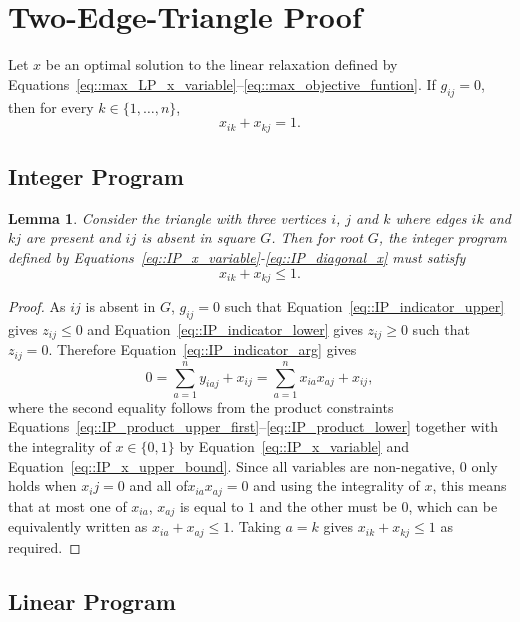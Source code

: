 \documentclass[11pt]{article}
\newtheorem{lemma}{Lemma}
\begin{document}
\section{Two-Edge-Triangle Proof} \label{sec::two_edge_triangle_proof}

Let $x$ be an optimal solution to the linear relaxation defined by Equations~\eqref{eq::max_LP_x_variable}--\eqref{eq::max_objective_funtion}. 
If $g_{ij}=0$, then for every $k\in\{1,\dots,n\}$,
\[
x_{ik}+x_{kj}=1.
\]

\subsection{Integer Program} \label{subsec::triangle_two_edges_integer_program}

\begin{lemma} \label{lemma::two_edges_integer_sum}
  Consider the triangle with three vertices $i$, $j$ and $k$ where edges $ik$ and $kj$ are present and $ij$ is absent in square $G$. Then for root $G$, the integer program defined by Equations~\eqref{eq::IP_x_variable}-\eqref{eq::IP_diagonal_x} must satisfy
  \[
  x_{ik} + x_{kj} \leq 1. 
  \]
\end{lemma}
\begin{proof}
  As $ij$ is absent in $G$, $g_{ij} = 0$ such that Equation~\eqref{eq::IP_indicator_upper} gives $z_{ij} \leq 0$ and Equation~\eqref{eq::IP_indicator_lower} gives $z_{ij} \geq 0$ such that $z_{ij} = 0$. Therefore Equation~\eqref{eq::IP_indicator_arg} gives 
  \[
  0 = \sum_{a=1}^{n}y_{iaj}+x_{ij} = \sum_{a=1}^{n}x_{ia}x_{aj}+x_{ij},
  \]
  where the second equality follows from the product constraints Equations~\eqref{eq::IP_product_upper_first}--\eqref{eq::IP_product_lower} together with the integrality of $x \in \{0, 1\}$ by Equation~\eqref{eq::IP_x_variable} and Equation~\eqref{eq::IP_x_upper_bound}. Since all variables are non-negative, $0$ only holds when $x_ij = 0$ and all of$x_{ia} x_{aj}=0$ and using the integrality of $x$, this means that at most one of $x_{ia}$, $x_{aj}$ is equal to $1$ and the other must be $0$, which can be equivalently written as $x_{ia} + x_{aj} \leq 1$. Taking $a=k$ gives $x_{ik}+x_{kj} \leq 1$ as required. 
\end{proof}

\subsection{Linear Program} \label{subsec::triangle_two_edges_linear_program}
\end{document}

